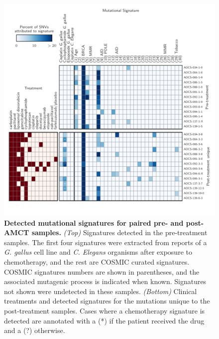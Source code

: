 \begin{figure}[htbp]
\centering
\includegraphics[scale=1.0]{figures/signatures.pdf}
\caption{\textbf{Detected mutational signatures for paired pre- and post-AMCT samples.} \textit{(Top)} Signatures detected in the pre-treatment samples. The first four signatures were extracted from reports of a \textit{G. gallus} cell line and \textit{C. Elegans} organisms after exposure to chemotherapy, and the rest are COSMIC curated signatures. COSMIC signatures numbers are shown in parentheses, and the associated mutagenic process is indicated when known. Signatures not shown were undetected in these samples. \textit{(Bottom)} Clinical treatments and detected signatures for the mutations unique to the post-treatment samples. Cases where a chemotherapy signature is detected are annotated with a (*) if the patient received the drug and a (?) otherwise.}
\label{fig:signatures}
\end{figure}

